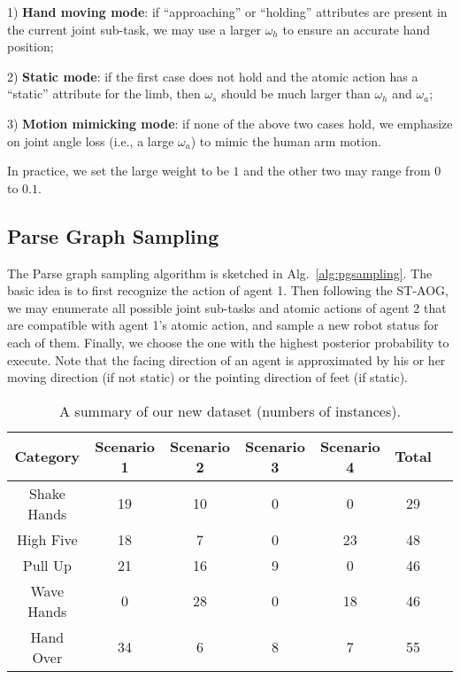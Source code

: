 \documentclass[letterpaper, 10 pt, conference]{ieeeconf}  %
\begin{document}
1) \textbf{Hand moving mode}: if ``approaching'' or ``holding'' attributes are present in the current joint sub-task, we may use a larger $\omega_h$ to ensure an accurate hand position;

2) \textbf{Static mode}: if the first case does not hold and the atomic action has a ``static'' attribute for the limb, then $\omega_s$ should be much larger than $\omega_h$ and $\omega_a$; 

3) \textbf{Motion mimicking mode}: if none of the above two cases hold, we emphasize on joint angle loss (i.e., a large $\omega_a$) to mimic the human arm motion.


In practice, we set the large weight to be $1$ and the other two may range from $0$ to $0.1$.




\subsection{Parse Graph Sampling}

The Parse graph sampling algorithm is sketched in Alg.~{\ref{alg:pgsampling}}. The basic idea is to first recognize the action of agent 1. Then following the ST-AOG, we may enumerate all possible joint sub-tasks and atomic actions of agent 2 that are compatible with agent 1's atomic action, and sample a new robot status for each of them. Finally, we choose the one with the highest posterior probability to execute. Note that the facing direction of an agent is approximated by his or her moving direction (if not static) or the pointing direction of feet (if static).




\begin{table}[t!]\scriptsize
\caption{A summary of our new dataset (numbers of instances).}
\vspace{-10pt}
\label{table:dataset}
\begin{center}
\tabcolsep=0.08cm
\begin{tabular}{|c|c|c|c|c|c|c|}
\hline
Category & Scenario 1 & Scenario 2 & Scenario 3 & Scenario 4 & Total\\ \hline%
Shake Hands & 19 & 10 & 0 & 0 & 29\\ \hline
High Five & 18 & 7 & 0 & 23 & 48\\ \hline
Pull Up & 21 & 16 &	9 & 0 & 46 \\ \hline
Wave Hands & 0 & 28 & 0 & 18 & 46\\ \hline
Hand Over & 34 & 6 & 8 & 7 & 55 \\
\hline
\end{tabular}
\end{center}
\vspace{-5pt}
\end{table}
\end{document}
